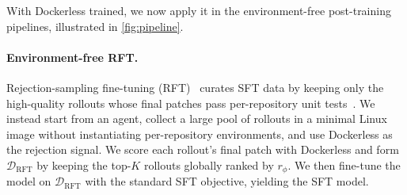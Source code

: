 \documentclass{llmxive}
\providecommand{\approach}{Dockerless\xspace}
\providecommand{\zeng}[1]{\textbf{[Zeng: #1]}}
\begin{document}
With \approach trained, we now apply it in the environment-free post-training pipelines, illustrated in \cref{fig:pipeline}.

\paragraph{Environment-free RFT.}
Rejection-sampling fine-tuning (RFT)~\citep{yuan2023scaling} curates SFT data by keeping only the high-quality rollouts whose final patches pass per-repository unit tests~\citep{pan2025training,jain2025r2e}.
We instead start from an agent, collect a large pool of rollouts in a minimal Linux image without instantiating per-repository environments, and use \approach as the rejection signal.
We score each rollout's final patch with \approach and form $\mathcal{D}_{\text{RFT}}$ by keeping the top-$K$ rollouts globally ranked by $r_\phi$.
We then fine-tune the model on $\mathcal{D}_{\text{RFT}}$ with the standard SFT objective, yielding the SFT model.

\end{document}
